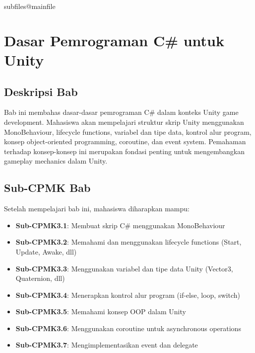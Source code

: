 \documentclass[../../main.tex]{subfiles}
\begin{document}
\ifcsname subfiles@mainfile\endcsname\else
    \setcounter{chapter}{2}
\fi
\chapter{Dasar Pemrograman C\# untuk Unity}

\section{Deskripsi Bab}

Bab ini membahas dasar-dasar pemrograman C\# dalam konteks Unity game development. Mahasiswa akan mempelajari struktur skrip Unity menggunakan MonoBehaviour, lifecycle functions, variabel dan tipe data, kontrol alur program, konsep object-oriented programming, coroutine, dan event system. Pemahaman terhadap konsep-konsep ini merupakan fondasi penting untuk mengembangkan gameplay mechanics dalam Unity.

\section{Sub-CPMK Bab}

Setelah mempelajari bab ini, mahasiswa diharapkan mampu:
\begin{itemize}
\item \textbf{Sub-CPMK3.1}: Membuat skrip C\# menggunakan MonoBehaviour
\item \textbf{Sub-CPMK3.2}: Memahami dan menggunakan lifecycle functions (Start, Update, Awake, dll)
\item \textbf{Sub-CPMK3.3}: Menggunakan variabel dan tipe data Unity (Vector3, Quaternion, dll)
\item \textbf{Sub-CPMK3.4}: Menerapkan kontrol alur program (if-else, loop, switch)
\item \textbf{Sub-CPMK3.5}: Memahami konsep OOP dalam Unity
\item \textbf{Sub-CPMK3.6}: Menggunakan coroutine untuk asynchronous operations
\item \textbf{Sub-CPMK3.7}: Mengimplementasikan event dan delegate
\end{itemize}











\end{document}
